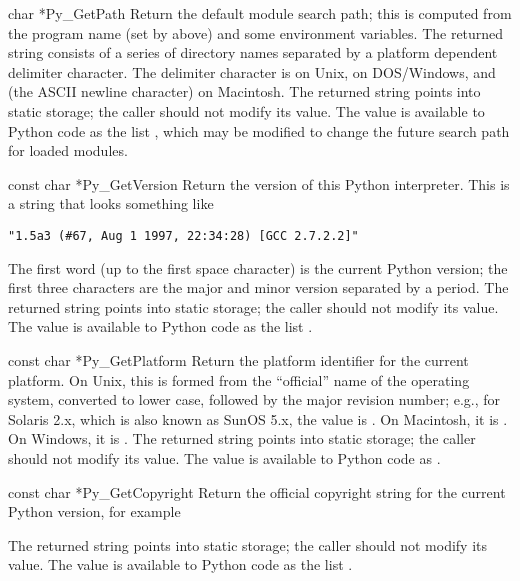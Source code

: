 \documentclass[twoside]{report}
\begin{document}
\begin{cfuncdesc}{char *}{Py_GetPath}{}
Return the default module search path; this is computed from the 
program name (set by  above) and some 
environment variables.  The returned string consists of a series of 
directory names separated by a platform dependent delimiter character.  
The delimiter character is  on Unix,  on 
DOS/Windows, and  (the ASCII newline character) on 
Macintosh.  The returned string points into static storage; the caller 
should not modify its value.  The value is available to Python code 
as the list , which may be modified to change the 
future search path for loaded modules.

\end{cfuncdesc}

\begin{cfuncdesc}{const char *}{Py_GetVersion}{}
Return the version of this Python interpreter.  This is a string that 
looks something like

\begin{verbatim}
"1.5a3 (#67, Aug 1 1997, 22:34:28) [GCC 2.7.2.2]"
\end{verbatim}

The first word (up to the first space character) is the current Python 
version; the first three characters are the major and minor version 
separated by a period.  The returned string points into static storage; 
the caller should not modify its value.  The value is available to 
Python code as the list .
\end{cfuncdesc}

\begin{cfuncdesc}{const char *}{Py_GetPlatform}{}
Return the platform identifier for the current platform.  On Unix, 
this is formed from the ``official'' name of the operating system, 
converted to lower case, followed by the major revision number; e.g., 
for Solaris 2.x, which is also known as SunOS 5.x, the value is 
.  On Macintosh, it is .  On Windows, it 
is .  The returned string points into static storage; 
the caller should not modify its value.  The value is available to 
Python code as .
\end{cfuncdesc}

\begin{cfuncdesc}{const char *}{Py_GetCopyright}{}
Return the official copyright string for the current Python version, 
for example


The returned string points into static storage; the caller should not 
modify its value.  The value is available to Python code as the list 
.
\end{cfuncdesc}
\end{document}
